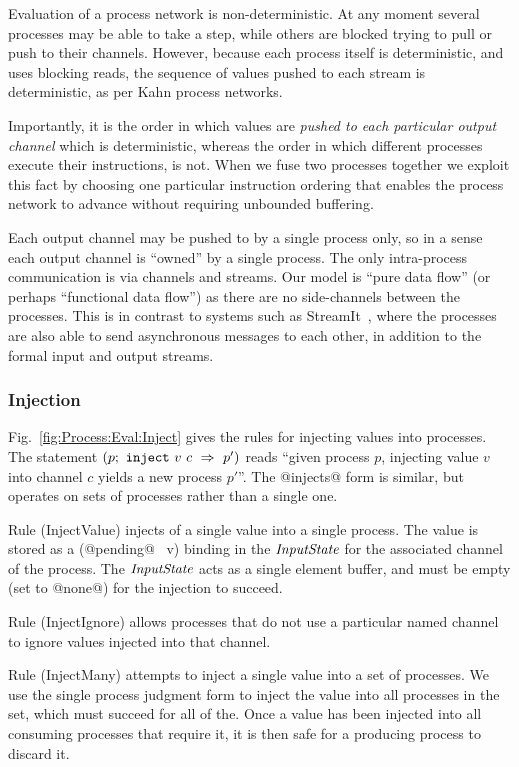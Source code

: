 Evaluation of a process network is non-deterministic. At any moment several processes may be able to take a step, while others are blocked trying to pull or push to their channels. However, because each process itself is deterministic, and uses blocking reads, the sequence of values pushed to each stream is deterministic, as per Kahn process networks. 

Importantly, it is the order in which values are \emph{pushed to each particular output channel} which is deterministic, whereas the order in which different processes execute their instructions, is not. When we fuse two processes together we exploit this fact by choosing one particular instruction ordering that enables the process network to advance without requiring unbounded buffering.

Each output channel may be pushed to by a single process only, so in a sense each output channel is ``owned'' by a single process. The only intra-process communication is via channels and streams. Our model is ``pure data flow'' (or perhaps ``functional data flow'') as there are no side-channels between the processes. This is in contrast to systems such as StreamIt~\cite{thies2002streamit}, where the processes are also able to send asynchronous messages to each other, in addition to the formal input and output streams.



\subsubsection{Injection}
Fig.~\ref{fig:Process:Eval:Inject} gives the rules for injecting values into processes. The statement $(p;~\texttt{inject}~v~c~\Rightarrow~p')$ reads ``given process $p$, injecting value $v$ into channel $c$ yields a new process $p'$''. The @injects@ form is similar, but operates on sets of processes rather than a single one.

Rule (InjectValue) injects of a single value into a single process. The value is stored as a (@pending@~ v) binding in the $\textit{InputState}$ for the associated channel of the process. The $\textit{InputState}$ acts as a single element buffer, and must be empty (set to @none@) for the injection to succeed.

Rule (InjectIgnore) allows processes that do not use a particular named channel to ignore values injected into that channel.

Rule (InjectMany) attempts to inject a single value into a set of processes. We use the single process judgment form to inject the value into all processes in the set, which must succeed for all of the. Once a value has been injected into all consuming processes that require it, it is then safe for a producing process to discard it.

